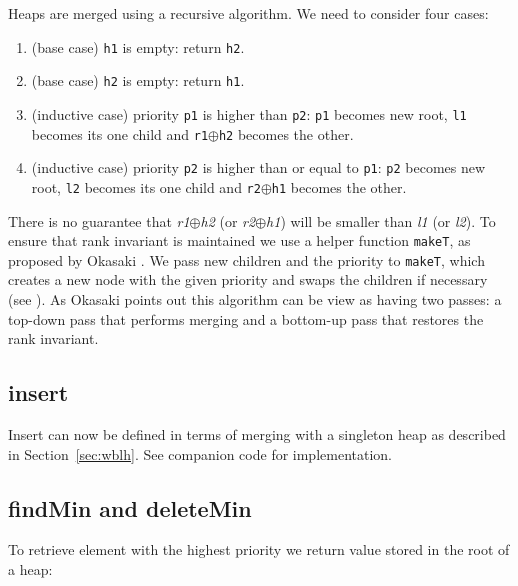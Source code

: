Heaps are merged using a recursive algorithm. We need to consider four cases:

\begin{enumerate}
 \item (base case) \texttt{h1} is empty: return \texttt{h2}.
 \item (base case) \texttt{h2} is empty: return \texttt{h1}.
 \item (inductive case) priority \texttt{p1} is higher than \texttt{p2}: \texttt{p1} becomes new root, \texttt{l1} becomes its one child and \texttt{r1}$\oplus$\texttt{h2} becomes the other.
 \item (inductive case) priority \texttt{p2} is higher than or equal to \texttt{p1}: \texttt{p2} becomes new root, \texttt{l2} becomes its one child and \texttt{r2}$\oplus$\texttt{h1} becomes the other.
\end{enumerate}
\noindent
There is no guarantee that \textit{r1}$\oplus$\textit{h2} (or \textit{r2}$\oplus$\textit{h1}) will be smaller than \textit{l1} (or \textit{l2}). To ensure that rank invariant is maintained we use a helper function \texttt{makeT}, as proposed by Okasaki \cite{Oka99}. We pass new children and the priority to \texttt{makeT}, which creates a new node with the given priority and swaps the children if necessary (see ). As Okasaki points out this algorithm can be view as having two passes: a top-down pass that performs merging and a bottom-up pass that restores the rank invariant.

\subsection{insert}

Insert can now be defined in terms of merging with a singleton heap as described in Section~\ref{sec:wblh}. See companion code for implementation.

\subsection{findMin and deleteMin}

To retrieve element with the highest priority we return value stored in the root of a heap:

